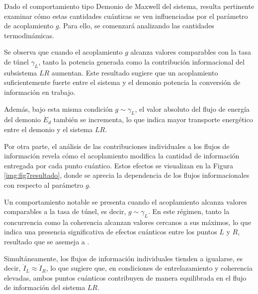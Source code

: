 Dado el comportamiento tipo Demonio de Maxwell del sistema, resulta pertinente examinar cómo estas cantidades cuánticas se ven influenciadas por el parámetro de acoplamiento \( g \). Para ello, se comenzará analizando las cantidades termodinámicas.


Se observa que cuando el acoplamiento \( g \) alcanza valores comparables con la tasa de túnel \( \gamma_{L} \), tanto la potencia generada como la contribución informacional del subsistema \( LR \) aumentan. Este resultado sugiere que un acoplamiento suficientemente fuerte entre el sistema y el demonio potencia la conversión de información en trabajo. 

Además, bajo esta misma condición \( g \sim \gamma_{L} \), el valor absoluto del flujo de energía del demonio \( \dot{E}_{d} \) también se incrementa, lo que indica mayor transporte energético entre el demonio y el sistema $LR$.

Por otra parte, el análisis de las contribuciones individuales a los flujos de información revela cómo el acoplamiento modifica la cantidad de información entregada por cada punto cuántico. Estos efectos se visualizan en la Figura \ref{img:fig7resultado}, donde se aprecia la dependencia de los flujos informacionales con respecto al parámetro \( g \).


Un comportamiento notable se presenta cuando el acoplamiento alcanza valores comparables a la tasa de túnel, es decir, \( g \sim \gamma_{L} \). En este régimen, tanto la concurrencia como la coherencia alcanzan valores cercanos a sus máximos, lo que indica una presencia significativa de efectos cuánticos entre los puntos \( L \) y \( R \), resultado que se asemeja a \cite{prech2023entanglement}. 

Simultáneamente, los flujos de información individuales tienden a igualarse, es decir, \( \dot{I}_{L} \approx \dot{I}_{R} \), lo que sugiere que, en condiciones de entrelazamiento y coherencia elevadas, ambos puntos cuánticos contribuyen de manera equilibrada en el flujo de información del sistema $LR$. 


